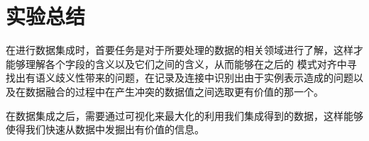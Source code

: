 \section{实验总结}
在进行数据集成时，首要任务是对于所要处理的数据的相关领域进行了解，这样才能够理解各个字段的含义以及它们之间的含义，从而能够在之后的
模式对齐中寻找出有语义歧义性带来的问题，在记录及连接中识别出由于实例表示造成的问题以及在数据融合的过程中在产生冲突的数据值之间选取更有价值的那一个。

在数据集成之后，需要通过可视化来最大化的利用我们集成得到的数据，这样能够使得我们快速从数据中发掘出有价值的信息。